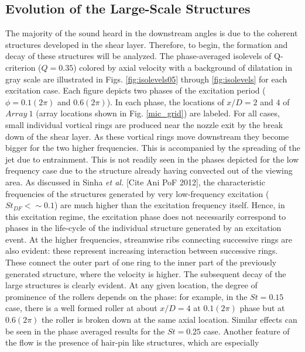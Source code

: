 \documentclass[english]{aiaa-tc}
\begin{document}
\subsection{Evolution of the Large-Scale Structures}\label{structure}
The majority of the sound heard in the downstream angles is due to the coherent structures developed in the shear layer. Therefore, to begin, the formation and decay of these structures will be analyzed. The phase-averaged isolevels of Q-criterion ($Q=0.35$) colored by axial velocity with a background of dilatation in gray scale are illustrated in Figs. \ref{fig:isolevels05} through \ref{fig:isolevels} for each excitation case. Each figure depicts two phases of the excitation period ($\phi =0.1(2\pi)$ and $0.6(2\pi)$). In each phase, the locations of $x/D=2$ and $4$ of $Array~1$ (array locations shown in Fig. \ref{mic_grid}) are labeled.
For all cases, small individual vortical rings are produced near the
nozzle exit by the break down of the shear layer. As these vortical
rings move downstream they become bigger for the two higher
frequencies.  This is accompanied by the spreading of the jet due to
entrainment.  This is not readily seen in the phases depicted for the low frequency case due to the structure already having convected out of the viewing area. 
As discussed in Sinha \emph{et al.} [Cite Ani PoF 2012], the characteristic frequencies of the structures generated by very low-frequency excitation ($St_{DF} < \sim 0.1$) are much higher than the excitation frequency itself.
Hence, in this excitation regime, the excitation phase does not necessarily correspond to phases in the life-cycle of the individual structure generated by an excitation event.
At the higher frequencies, streamwise ribs connecting
successive rings are also evident\cite{gdv2011-POF}: these represent
increasing interaction between successive rings.  These connect the
outer part of one ring to the inner part of the previously generated
structure, where the velocity is higher.  The subsequent decay of
the large structures is clearly evident.  At any given location, the
degree of prominence of the rollers depends on the phase: for example,
in the $St=0.15$ case, there is a well formed roller at about $x/D=4$ at
$0.1(2\pi)$ phase but at $0.6(2\pi)$ the roller is broken
down at the same axial location.  Similar effects can be seen in the
phase averaged results for the $St=0.25$ case. Another feature of the
flow is the presence of hair-pin like structures, which are especially
\end{document}
